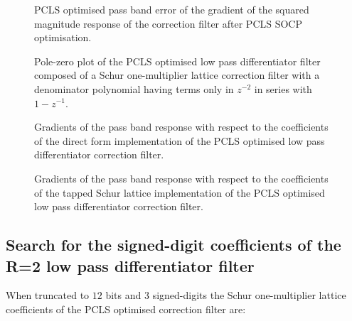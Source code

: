 \documentclass[a4paper,twoside,10pt,english]{article}
\newcommand{\DesignOfSchurLatticeFiltersPdfScale}{1}
\begin{document}
\begin{figure}
\centering
\scalebox{\DesignOfSchurLatticeFiltersPdfScale}{}
\caption{PCLS optimised pass band error of the gradient of the squared magnitude
  response of the correction filter after PCLS SOCP optimisation.}
\label{fig:Schur-OneM-lattice-lowpass-differentiator-R2-dCsqdw-error}
\end{figure}

\begin{figure}
\centering
\scalebox{\DesignOfSchurLatticeFiltersPdfScale}{}
\caption{Pole-zero plot of the PCLS optimised low pass differentiator
  filter composed of a Schur one-multiplier lattice correction filter with a
  denominator polynomial having terms only in $z^{-2}$ in series with $1-z^{-1}$.}
\label{fig:Schur-OneM-lattice-lowpass-differentiator-R2-pz}
\end{figure}

\begin{figure}
\centering
\scalebox{\DesignOfSchurLatticeFiltersPdfScale}{}
\caption{Gradients of the pass band response with respect to the coefficients of
  the direct form implementation of the PCLS optimised low pass differentiator
  correction filter.}
\label{fig:Schur-OneM-lattice-correction-lowpass-differentiator-direct-sens}
\end{figure}

\begin{figure}
\centering
\scalebox{\DesignOfSchurLatticeFiltersPdfScale}{}
\caption{Gradients of the pass band response with respect to the coefficients of
  the tapped Schur lattice implementation of the PCLS optimised low pass
  differentiator correction filter.}
\label{fig:Schur-OneM-lattice-correction-lowpass-differentiator-Schur-sens}
\end{figure}

\subsection{Search for the signed-digit coefficients of the R=2 low pass differentiator filter}

When truncated to $12$ bits and $3$ signed-digits the Schur one-multiplier
lattice coefficients of the PCLS optimised correction filter are:
\begin{small}


\end{small}
\end{document}
